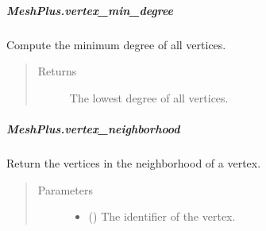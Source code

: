 \documentclass[letterpaper,10pt,english]{sphinxmanual}
\begin{document}
\begin{fulllineitems}
\begin{fulllineitems}
\begin{quote}
\begin{description}
\end{description}\end{quote}

\end{fulllineitems}



\subparagraph{MeshPlus.vertex\_min\_degree}
\label{\detokenize{api/generated/directional_clustering.mesh.MeshPlus.vertex_min_degree:meshplus-vertex-min-degree}}\label{\detokenize{api/generated/directional_clustering.mesh.MeshPlus.vertex_min_degree::doc}}

\begin{fulllineitems}
\label{\detokenize{api/generated/directional_clustering.mesh.MeshPlus.vertex_min_degree:directional_clustering.mesh.MeshPlus.vertex_min_degree}}
Compute the minimum degree of all vertices.
\begin{quote}\begin{description}
\item[{Returns}] \leavevmode
{} \textendash{} The lowest degree of all vertices.

\end{description}\end{quote}

\end{fulllineitems}



\subparagraph{MeshPlus.vertex\_neighborhood}
\label{\detokenize{api/generated/directional_clustering.mesh.MeshPlus.vertex_neighborhood:meshplus-vertex-neighborhood}}\label{\detokenize{api/generated/directional_clustering.mesh.MeshPlus.vertex_neighborhood::doc}}

\begin{fulllineitems}
\label{\detokenize{api/generated/directional_clustering.mesh.MeshPlus.vertex_neighborhood:directional_clustering.mesh.MeshPlus.vertex_neighborhood}}
Return the vertices in the neighborhood of a vertex.
\begin{quote}\begin{description}
\item[{Parameters}] \leavevmode\begin{itemize}
\item {} 
 () \textendash{} The identifier of the vertex.


\end{itemize}
\end{description}
\end{quote}
\end{fulllineitems}
\end{fulllineitems}
\end{document}

